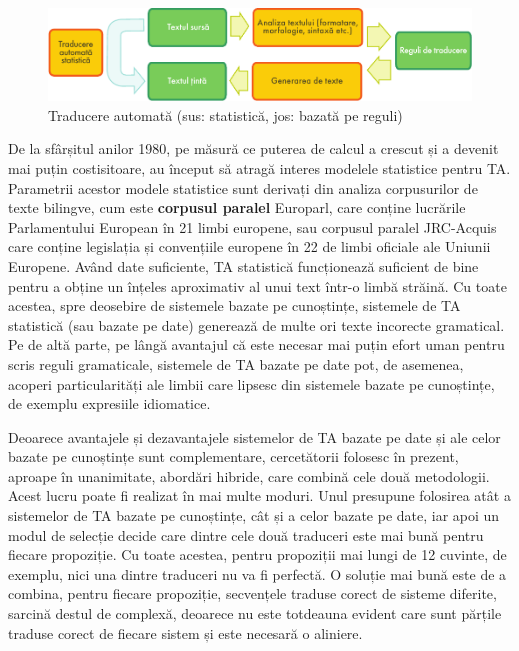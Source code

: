 \begin{multicols}{2}
\begin{figure}[htb]
\center
\includegraphics[width=\textwidth]{../_media/romanian/machine_translation}
\caption{Traducere automată (sus: statistică, jos: bazată pe reguli)}
\label{fig:mtarch_de}
\end{figure}

De la sfârșitul anilor 1980, pe măsură ce puterea de calcul a crescut și a devenit mai puțin costisitoare, au început să atragă interes modelele statistice pentru TA. Parametrii acestor modele statistice sunt derivați din analiza corpusurilor de texte bilingve, cum este \textbf{corpusul paralel} Europarl, care conține lucrările Parlamentului European în 21 limbi europene, sau corpusul paralel JRC-Acquis care conține legislația și convențiile europene în 22 de limbi oficiale ale Uniunii Europene. Având date suficiente, TA statistică funcționează suficient de bine pentru a obține un înțeles aproximativ al unui text într-o limbă străină. Cu toate acestea, spre deosebire de sistemele bazate pe cunoștințe, sistemele de TA statistică (sau bazate pe date) generează de multe ori texte incorecte gramatical. Pe de altă parte, pe lângă avantajul că este necesar mai puțin efort uman pentru scris reguli gramaticale, sistemele de TA bazate pe date pot, de asemenea, acoperi particularități ale limbii care lipsesc din sistemele bazate pe cunoștințe, de exemplu expresiile idiomatice.

Deoarece avantajele și dezavantajele sistemelor de TA bazate pe date și ale celor bazate pe cunoștințe sunt complementare, cercetătorii folosesc în prezent, aproape în unanimitate, abordări hibride, care combină cele două metodologii. Acest lucru poate fi realizat în mai multe moduri. Unul presupune folosirea atât a sistemelor de TA bazate pe cunoștințe, cât și a celor bazate pe date, iar apoi un modul de selecție decide care dintre cele două traduceri este mai bună pentru fiecare propoziție. Cu toate acestea, pentru propoziții mai lungi de 12 cuvinte, de exemplu, nici una dintre traduceri nu va fi perfectă. O soluție mai bună este de a combina, pentru fiecare propoziție, secvențele traduse corect de sisteme diferite, sarcină destul de complexă, deoarece nu este totdeauna evident care sunt părțile traduse corect de fiecare sistem și este necesară o aliniere. 


\end{multicols}

